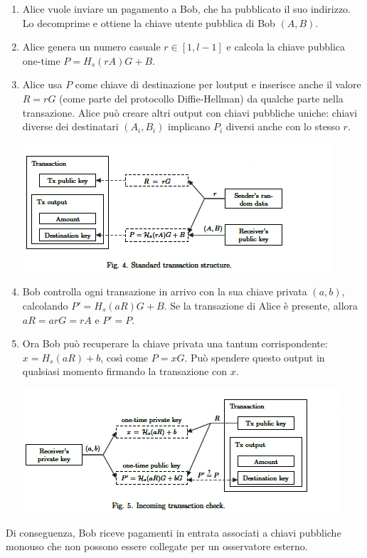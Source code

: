 \begin{enumerate}
\def\labelenumi{\arabic{enumi}.}
\item
  Alice vuole inviare un pagamento a Bob, che ha pubblicato il suo
  indirizzo. Lo decomprime e ottiene la chiave utente pubblica di Bob
  \emph{$(A, B)$}.
\item
  Alice genera un numero casuale $r \in [1,l-1]$ e calcola la chiave
  pubblica one-time $P=H_s(rA)G+B$.
\item
  Alice usa $P$ come chiave di destinazione per l\textquotesingle output e
  inserisce anche il valore $R=rG$ (come parte del protocollo
  Diffie-Hellman) da qualche parte nella transazione. Alice può creare
  altri output con chiavi pubbliche uniche: chiavi diverse dei
  destinatari \emph{$(A_i,B_i)$} implicano $P_i$ diversi anche con
  lo stesso $r$.

  \includegraphics{image3.png}
\item
  Bob controlla ogni transazione in arrivo con la sua chiave privata $(a,
  b)$, calcolando $P'=H_s(aR)G+B$. Se la transazione di Alice è presente,
  allora $aR=arG=rA$ e $P'=P$.
\item
  Ora Bob può recuperare la chiave privata una tantum corrispondente:
  $x=H_s(aR)+b$, così come $P=xG$. Può spendere questo output in qualsiasi
  momento firmando la transazione con $x$.

  \includegraphics{image4.png}
\end{enumerate}

Di conseguenza, Bob riceve pagamenti in entrata associati a chiavi
pubbliche monouso che non possono essere collegate per un osservatore
esterno.

